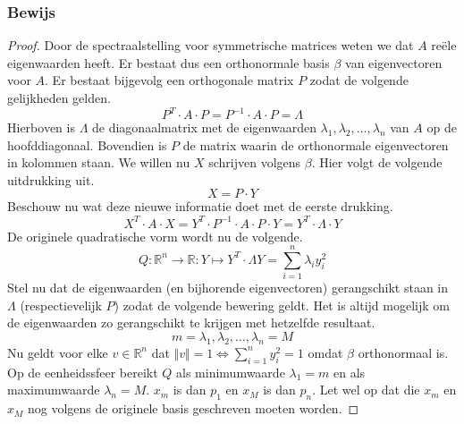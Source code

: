 \documentclass[lineaire_algebra_oplossingen.tex]{subfiles}
\begin{document}
\subsubsection*{Bewijs}
\begin{proof}
Door de spectraalstelling voor symmetrische matrices weten we dat $A$ re\"ele eigenwaarden heeft.
Er bestaat dus een orthonormale basis $\beta$ van eigenvectoren voor $A$.
Er bestaat bijgevolg een orthogonale matrix $P$ zodat de volgende gelijkheden gelden.
\[
P^T\cdot A\cdot P = P^{-1}\cdot A\cdot P = \Lambda
\]
Hierboven is $\Lambda$ de diagonaalmatrix met de eigenwaarden $\lambda_1,\lambda_2,\ldots,\lambda_n$ van $A$ op de hoofddiagonaal.
Bovendien is $P$ de matrix waarin de orthonormale eigenvectoren in kolommen staan.
We willen nu $X$ schrijven volgens $\beta$. Hier volgt de volgende uitdrukking uit.
\[
X = P\cdot Y
\]
Beschouw nu wat deze nieuwe informatie doet met de eerste drukking.
\[
X^T\cdot A \cdot X = Y^T\cdot P^{-1}\cdot A\cdot P\cdot Y  = Y^T\cdot \Lambda \cdot Y
\]
De originele quadratische vorm wordt nu de volgende.
\[
Q:\mathbb{R}^n \rightarrow \mathbb{R}: Y \mapsto Y^T\cdot \Lambda Y = \sum_{i=1}^n\lambda_iy_i^2
\]
Stel nu dat de eigenwaarden (en bijhorende eigenvectoren) gerangschikt staan in $\Lambda$ (respectievelijk $P$) zodat de volgende bewering geldt. 
Het is altijd mogelijk om de eigenwaarden zo gerangschikt te krijgen met hetzelfde resultaat.
\[
m=\lambda_1,\lambda_2,\ldots,\lambda_n=M
\]
Nu geldt voor elke $v\in \mathbb{R}^n$ dat $\Vert v\Vert = 1 \Leftrightarrow \sum_{i=1}^ny_i^2 = 1$ omdat $\beta$ orthonormaal is.
Op de eenheidssfeer bereikt $Q$ als minimumwaarde $\lambda_1=m$ en als maximumwaarde $\lambda_n=M$. $x_m$ is dan $p_1$ en $x_M$ is dan $p_n$. Let wel op dat die $x_m$ en $x_M$ nog volgens de originele basis geschreven moeten worden.
\end{proof}
\end{document}
